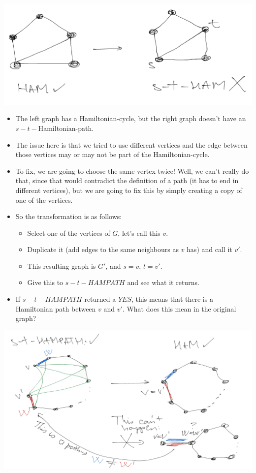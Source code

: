 \begin{center}
\includegraphics[width=\linewidth]{./08/03/issue_1.png}
\end{center}

\begin{itemize}
    \item The left graph has a Hamiltonian-cycle, but the right graph doesn't have an $s-t-$Hamiltonian-path.
    \item The issue here is that we tried to use different vertices and the edge between those vertices may or may not be part of the Hamiltonian-cycle.
    \item To fix, we are going to choose the same vertex twice! Well, we can't really do that, since that would contradict the definition of a path (it has to end in different vertices), but we are going to fix this by simply creating a copy of one of the vertices.
    \item So the transformation is as follows:
    \begin{itemize}
        \item Select one of the vertices of $G$, let's call this $v$.
        \item Duplicate it (add edges to the same neighbours as $v$ has) and call it $v'$.
        \item This resulting graph is $G'$, and $s=v$, $t=v'$.
        \item Give this to $s-t-HAMPATH$ and see what it returns.
    \end{itemize}
    \item If $s-t-HAMPATH$ returned a $YES$, this means that there is a Hamiltonian path between $v$ and $v'$. What does this mean in the original graph?
\end{itemize}

\begin{center}
\includegraphics[width=\linewidth]{./08/03/ham_yes.png}
\end{center}

